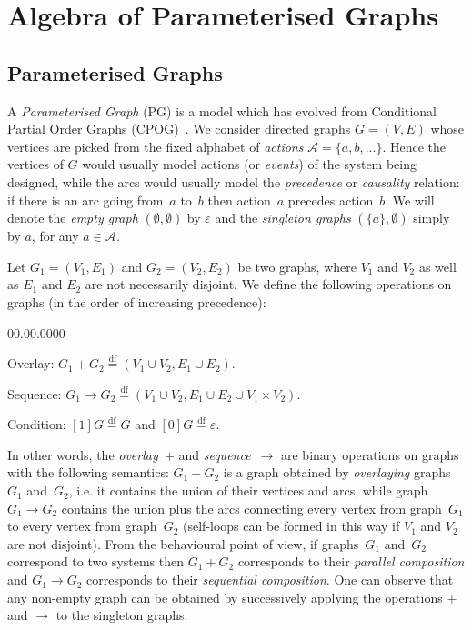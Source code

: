 \chapter{Algebra of Parameterised Graphs}

\section{Parameterised Graphs\label{sec:Parametrised-Graphs}}

A \emph{Parameterised Graph} (PG) is a model which has evolved from
Conditional Partial Order Graphs (CPOG)~\cite{2010_mokhov_ieee}.
We consider directed graphs $G=(V,E)$ whose vertices are picked from
the fixed alphabet of \emph{actions} $\mathcal{A}=\{a,b,...\}$. Hence
the vertices of $G$ would usually model actions\emph{ }(or \emph{events}\/)
of the system being designed, while the arcs would usually model the
\emph{precedence} or \emph{causality} relation: if there is an arc
going from~$a$ to~$b$ then action~$a$ precedes action~$b$.
We will denote the \emph{empty graph} $(\emptyset,\emptyset)$ by
$\varepsilon$ and the \emph{singleton graphs} $(\{a\},\emptyset)$
simply by $a$, for any $a\in\mathcal{A}$\emph{.}

Let $G_{1}=(V_{1},E_{1})$ and $G_{2}=(V_{2},E_{2})$ be two graphs,
where $V_{1}$ and $V_{2}$ as well as $E_{1}$ and $E_{2}$ are not
necessarily disjoint. We define the following operations on graphs
(in the order of increasing precedence):
\begin{lyxlist}{00.00.0000}
\item [{\hspace{6mm}Overlay:}] $G_{1}+G_{2}\overset{\mathrm{df}}{=}(V_{1}\cup V_{2},E_{1}\cup E_{2})$.
\item [{\hspace{6mm}Sequence:}] $G_{1}\rightarrow G_{2}\overset{\mathrm{df}}{=}(V_{1}\cup V_{2},E_{1}\cup E_{2}\cup V_{1}\times V_{2})$.
\item [{\hspace{6mm}Condition:}] $[1]G\overset{\mathrm{df}}{=}G$ and
$[0]G\overset{\mathrm{df}}{=}\varepsilon$.
\end{lyxlist}
In other words, the \emph{overlay~}$+$ and \emph{sequence}~$\rightarrow$
are binary operations on graphs with the following semantics: $G_{1}+G_{2}$
is a graph obtained by \emph{overlaying} graphs~$G_{1}$ and~$G_{2}$,
i.e. it contains the union of their vertices and arcs, while graph
$G_{1}\rightarrow G_{2}$ contains the union plus the arcs connecting
every vertex from graph~$G_{1}$ to every vertex from graph~$G_{2}$
(self-loops can be formed in this way if $V_{1}$ and $V_{2}$ are
not disjoint). From the behavioural point of view, if graphs~$G_{1}$
and~$G_{2}$ correspond to two systems then $G_{1}+G_{2}$ corresponds
to their \emph{parallel composition} and $G_{1}\rightarrow G_{2}$
corresponds to their \emph{sequential composition}. One can observe
that any non-empty graph can be obtained by successively applying
the operations $+$ and $\rightarrow$ to the singleton graphs.

